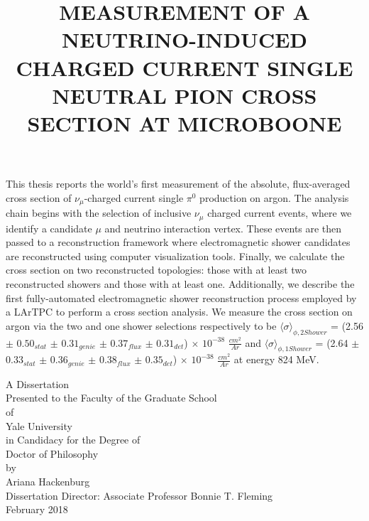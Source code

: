 This thesis reports the world's first measurement of the absolute, flux-averaged cross section of $\nu_{\mu}$-charged current single $\pi^0$ production on argon. The analysis chain begins with the selection of inclusive $\nu_\mu$ charged current events, where we identify a candidate $\mu$ and neutrino interaction vertex. These events are then passed to a reconstruction framework where electromagnetic shower candidates are reconstructed using computer visualization tools. Finally, we calculate the cross section on two reconstructed topologies: those with at least two reconstructed showers and those with at least one.  Additionally, we describe the first fully-automated electromagnetic shower reconstruction process employed by a LArTPC to perform a cross section analysis.  We measure the cross section on argon via the two and one shower selections respectively to be $\langle \sigma\rangle_{\phi,2 Shower}$ =
(2.56 $\pm$ $0.50_{stat}$ $\pm$ $0.31_{genie}$ $\pm$ $0.37_{flux}$ $\pm$ $0.31_{det}$) $\times$ $10^{-38}$ $\frac{cm^2}{Ar}$ and $\langle \sigma\rangle_{\phi,1 Shower}$ = (2.64 $\pm$ $0.33_{stat}$ $\pm$ $0.36_{genie}$ $\pm$ $0.38_{flux}$ $\pm$ $0.35_{det}$) $\times$ $10^{-38}$ $\frac{cm^2}{Ar}$ at energy 824 MeV.

\thispagestyle{empty}
\clearpage

\singlespacing
\title{MEASUREMENT OF A NEUTRINO-INDUCED CHARGED CURRENT SINGLE NEUTRAL PION CROSS SECTION AT MICROBOONE}
\date{}
\author{}
\maketitle

\vspace{4 cm}

\begin{center}
A Dissertation \\
Presented to the Faculty of the Graduate School \\
of \\
Yale University \\
in Candidacy for the Degree of \\
Doctor of Philosophy\\ 

\vspace{6 cm}
by \\
Ariana Hackenburg \\
\vspace{3 mm}
Dissertation Director: Associate Professor Bonnie T. Fleming \\
\vspace{3 mm}
February 2018 \\ 
\end{center}
\thispagestyle{empty}


